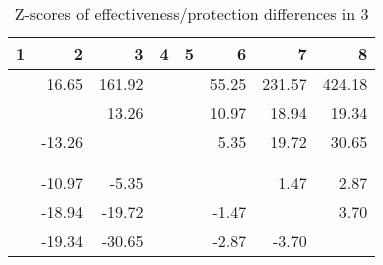 \begin{table}[ht]
\centering
\begin{tabular}{rrrrrrrr}
  \hline
1 & 2 & 3 & 4 & 5 & 6 & 7 & 8 \\ 
  \hline
 & 16.65 & 161.92 &  &  & 55.25 & 231.57 & 424.18 \\ 
   &  & 13.26 &  &  & 10.97 & 18.94 & 19.34 \\ 
   & -13.26 &  &  &  & 5.35 & 19.72 & 30.65 \\ 
   &  &  &  &  &  &  &  \\ 
   &  &  &  &  &  &  &  \\ 
   & -10.97 & -5.35 &  &  &  & 1.47 & 2.87 \\ 
   & -18.94 & -19.72 &  &  & -1.47 &  & 3.70 \\ 
   & -19.34 & -30.65 &  &  & -2.87 & -3.70 &  \\ 
   \hline
\end{tabular}
\caption{Z-scores of effectiveness/protection differences in  3} 
\end{table}
